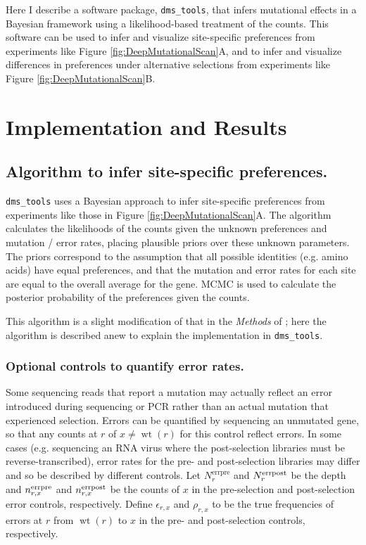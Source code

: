 \documentclass[twocolumn]{bmcart}%
\begin{document}
Here I describe a software package, \texttt{dms\_tools}, that infers mutational effects in a Bayesian framework using a likelihood-based treatment of the counts. This software can be used to infer and visualize site-specific preferences from experiments like Figure \ref{fig:DeepMutationalScan}A, and to infer and visualize differences in preferences under alternative selections from experiments like Figure \ref{fig:DeepMutationalScan}B. 

\section*{Implementation and Results}

\subsection*{Algorithm to infer site-specific preferences.}
\texttt{dms\_tools} uses a Bayesian approach to infer site-specific preferences from experiments like those in Figure \ref{fig:DeepMutationalScan}A. The algorithm calculates the likelihoods of the counts given the unknown preferences and mutation / error rates, placing plausible priors over these unknown parameters. The priors correspond to the assumption that all possible identities (e.g. amino acids) have equal preferences, and that the mutation and error rates for each site are equal to the overall average for the gene. MCMC is used to calculate the posterior probability of the preferences given the counts.

This algorithm is a slight modification of that in the \textsl{Methods} of \cite{bloom2014experimentally}; here the algorithm is described anew to explain the implementation in \texttt{dms\_tools}. 

\subsubsection*{Optional controls to quantify error rates.}
Some sequencing reads that report a mutation may actually reflect an error introduced during sequencing or PCR rather than an actual mutation that experienced selection. Errors can be quantified by sequencing an unmutated gene, so that any counts at $r$ of $x \ne \operatorname{wt}\left(r\right)$ for this control reflect errors. In some cases (e.g. sequencing an RNA virus where the post-selection libraries must be reverse-transcribed), error rates for the pre- and post-selection libraries may differ and so be described by different controls. Let $N_r^{\textrm{errpre}}$ and $N_r^{\rm{errpost}}$ be the depth and $n_{r,x}^{\rm{errpre}}$ and $n_{r,x}^{\rm{errpost}}$ be the counts of $x$ in the pre-selection and post-selection error controls, respectively. Define $\epsilon_{r,x}$ and $\rho_{r,x}$ to be the true frequencies of errors at $r$ from $\operatorname{wt}\left(r\right)$ to $x$ in the pre- and post-selection controls, respectively. 
\end{document}
